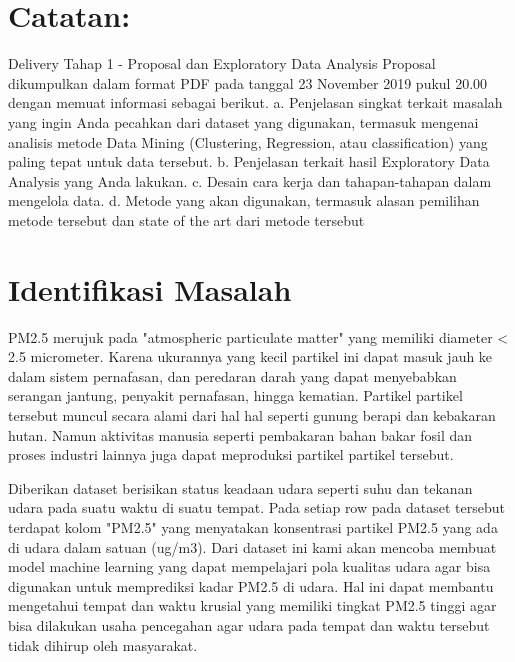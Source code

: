 \documentclass{article}
\begin{document}
    \begin{normalsize}
    
        \section{Catatan:}
        
        Delivery Tahap 1 - Proposal dan Exploratory Data Analysis
        Proposal dikumpulkan dalam format PDF pada tanggal 23 November 2019 pukul 20.00
        dengan memuat informasi sebagai berikut.
        a. Penjelasan singkat terkait masalah yang ingin Anda pecahkan dari dataset yang
        digunakan, termasuk mengenai analisis metode Data Mining (Clustering,
        Regression, atau classification) yang paling tepat untuk data tersebut.
        b. Penjelasan terkait hasil Exploratory Data Analysis yang Anda lakukan.
        c. Desain cara kerja dan tahapan-tahapan dalam mengelola data.
        d. Metode yang akan digunakan, termasuk alasan pemilihan metode tersebut dan
        state of the art dari metode tersebut
        
        \section{Identifikasi Masalah}
        
        PM2.5 merujuk pada "atmospheric particulate matter" yang memiliki diameter < 2.5 micrometer.
        Karena ukurannya yang kecil partikel ini dapat masuk jauh ke dalam sistem pernafasan, dan
        peredaran darah yang dapat menyebabkan serangan jantung, penyakit pernafasan, hingga kematian.
        Partikel partikel tersebut muncul secara alami dari hal hal seperti gunung berapi dan kebakaran
        hutan. Namun aktivitas manusia seperti pembakaran bahan bakar fosil dan proses industri lainnya
        juga dapat meproduksi partikel partikel tersebut.

        Diberikan dataset berisikan status keadaan udara seperti suhu dan tekanan udara
        pada suatu waktu di suatu tempat. Pada setiap row pada dataset tersebut terdapat kolom
        "PM2.5" yang menyatakan konsentrasi partikel PM2.5 yang ada di udara dalam satuan (ug/m3).
        Dari dataset ini kami akan mencoba membuat model machine learning yang dapat mempelajari pola
        kualitas udara agar bisa digunakan untuk memprediksi kadar PM2.5 di udara. Hal ini dapat
        membantu mengetahui tempat dan waktu krusial yang memiliki tingkat PM2.5 tinggi agar bisa
        dilakukan usaha pencegahan agar udara pada tempat dan waktu tersebut tidak dihirup oleh masyarakat.


\end{normalsize}
\end{document}
